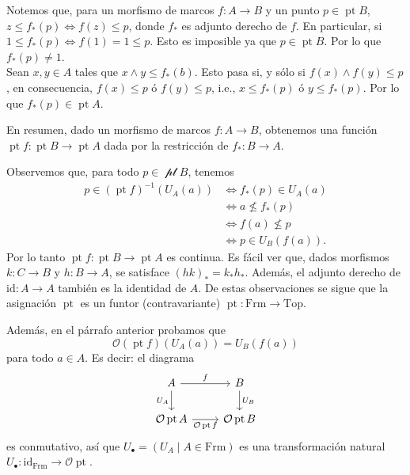 \documentclass[12pt,letterpaper,titlepage]{article}
\theoremstyle{definition}
\renewcommand\inf{\wedge}
\renewcommand\cal[1]{\mathcal{#1}}
\newcommand\<{\langle}
\renewcommand\>{\rangle}
\newcommand{\Frm}{\mathrm{Frm}}
\newcommand{\Top}{\mathrm{Top}}
\newcommand{\id}{\mathrm{id}}
\DeclareMathOperator{\pt}{pt}
\begin{document}
Notemos que, para un morfismo de marcos $f\colon A\to B$ y un punto $p\in \pt B$, $z\leq f_\ast (p)\iff f(z)\leq p$, donde $f_\ast$ es adjunto derecho de $f$. En particular, si $1\leq f_\ast(p)\iff f(1)=1\leq p$. Esto es imposible ya que $p\in \pt B$. Por lo que $f_\ast(p)\neq 1$.\\
Sean $x,y\in A$ tales que $x\inf y\leq f_\ast(b)$. Esto pasa si, y sólo si $f(x)\inf f(y)\leq p$, en consecuencia, $f(x)\leq p$ ó $f(y)\leq p$, i.e., $x\leq f_\ast (p)$ ó $y\leq f_\ast (p)$. Por lo que $f_\ast (p)\in \pt A$.\par 
En resumen, dado un morfismo de marcos $f\colon A\to B$, obtenemos una función $\pt f \colon \pt B\to \pt A$ dada por la restricción
de $f_*:B\to A$.\par
Observemos que, para todo $p\in \cal \pt B$, tenemos
\begin{align*}
    p\in (\pt f)^{-1} \left(U_A(a)\right)&\iff f_\ast (p)\in U_A(a)\\
    &\iff a\not\leq f_\ast (p)\\
    &\iff f(a)\not\leq p\\
    &\iff p\in U_B\left(f(a)\right).
\end{align*}
Por lo tanto $\pt f\colon \pt B\to \pt A$ es continua.
Es fácil ver que, dados morfismos $k:C\to B$ y $h:B\to A$,
se satisface $(hk)_*=k_*h_*$.
Además, el adjunto derecho de $\id:A\to A$ también es la identidad
de $A$.
De estas observaciones se sigue que la asignación $\pt$
es un funtor (contravariante) $\pt:\Frm\to\Top$.

Además, en el párrafo anterior probamos que
\[
    \cal O(\pt f)(U_A(a)) = U_B(f(a))
\]
para todo $a\in A$.
Es decir: el diagrama
\[
    \begin{tikzcd}
        A \ar[r,"f"] \ar[d,"U_A"'] & B \ar[d,"U_B"] \\
        \cal O\pt A \ar[r,"\cal O\pt f"'] & \cal O\pt B
    \end{tikzcd}
\]
es conmutativo, así que $U_\bullet=(U_A\mid A\in\Frm)$
es una transformación
natural $U_\bullet:\id_\Frm\to\cal O\pt$.
\end{document}
